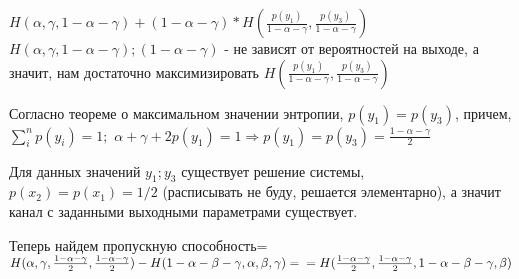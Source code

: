 \documentclass[../main.tex]{subfiles}
\begin{document}
$H(\alpha, \gamma, 1-\alpha-\gamma) + (1-\alpha-\gamma)*H(\frac{p(y_1)}{1-\alpha-\gamma}, \frac{p(y_3)}{1-\alpha-\gamma})$ \newline
$H(\alpha, \gamma, 1-\alpha-\gamma); (1-\alpha-\gamma)$ - не зависят от вероятностей на выходе, а значит, нам достаточно максимизировать $H(\frac{p(y_1)}{1-\alpha-\gamma}, \frac{p(y_3)}{1-\alpha-\gamma})$

Согласно теореме о максимальном значении энтропии, $p(y_1) = p(y_3)$, причем, $\sum\limits_{i}^{n}p(y_i)=1;$\newline
$\alpha + \gamma + 2p(y_1) =1 \Rightarrow p(y_1) = p(y_3) = \frac{1-\alpha-\gamma}{2}$ 

Для данных значений $y_1; y_3$ существует решение системы, $p(x_2)=p(x_1)=1/2$ (расписывать не буду, решается элементарно), а значит канал с заданными выходными параметрами существует.

Теперь найдем пропускную способность= $H(\alpha, \gamma, \frac{1-\alpha-\gamma}{2}, \frac{1-\alpha-\gamma}{2}) - H(1-\alpha-\beta - \gamma, \alpha, \beta, \gamma) = \newline =H(\frac{1-\alpha-\gamma}{2},\frac{1-\alpha-\gamma}{2}, 1-\alpha-\beta - \gamma, \beta)$
\end{document}
